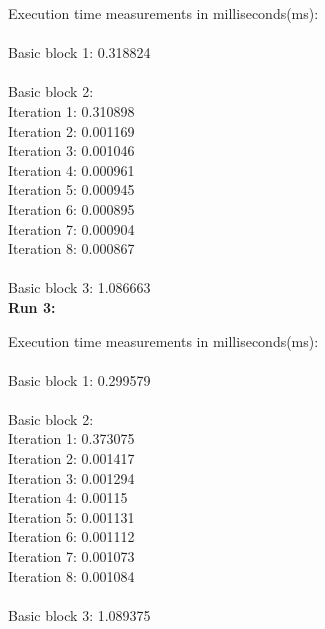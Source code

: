 \documentclass[11pt]{article}
\begin{document}
Execution time measurements in milliseconds(ms):\\
\\Basic block 1: 0.318824\\
\\Basic block 2:\\
\hspace{2em} Iteration 1: 0.310898\\
\hspace{2em} Iteration 2: 0.001169\\
\hspace{2em} Iteration 3: 0.001046\\
\hspace{2em} Iteration 4: 0.000961\\
\hspace{2em} Iteration 5: 0.000945\\
\hspace{2em} Iteration 6: 0.000895\\
\hspace{2em} Iteration 7: 0.000904\\
\hspace{2em} Iteration 8: 0.000867\\
\\Basic block 3: 1.086663\\

\textbf{Run 3:}

Execution time measurements in milliseconds(ms):\\
\\Basic block 1: 0.299579\\
\\Basic block 2:\\
\hspace{2em} Iteration 1: 0.373075\\
\hspace{2em} Iteration 2: 0.001417\\
\hspace{2em} Iteration 3: 0.001294\\
\hspace{2em} Iteration 4: 0.00115\\
\hspace{2em} Iteration 5: 0.001131\\
\hspace{2em} Iteration 6: 0.001112\\
\hspace{2em} Iteration 7: 0.001073\\
\hspace{2em} Iteration 8: 0.001084\\
\\Basic block 3: 1.089375\\
\end{document}

